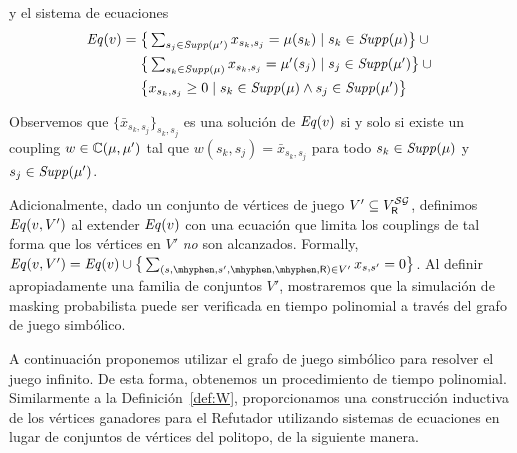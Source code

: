 \begin{definition}
  y el sistema de ecuaciones 
  {\footnotesize%
  \begin{align*}
    \mathit{Eq}(v) = {}
    & \textstyle
    \big\{ \sum_{s_j \in \mathit{Supp}(\mu')} x_{s_k,s_j}=\mu(s_k) \mid s_k \in \mathit{Supp}(\mu) \big\} \cup {} \\
    & \textstyle
    \big\{ \sum_{s_k \in \mathit{Supp}(\mu)} x_{s_k,s_j}=\mu'(s_j) \mid s_j \in \mathit{Supp}(\mu') \big\} \cup {} \\
    & \textstyle
    \big\{ x_{s_k,s_j} \geq 0 \mid s_k \in \mathit{Supp}(\mu) \wedge s_j \in \mathit{Supp}(\mu') \big\}
  \end{align*}
  }%
\end{definition} 


Observemos que $\{\bar{x}_{s_k,s_j}\}_{s_k,s_j}$ es una solución de 
$\mathit{Eq}(v)$ si y solo si existe un coupling
$w\in\mathbb{C}(\mu,\mu')$ tal que  $w(s_k,s_j)=\bar{x}_{s_k,s_j}$
para todo $s_k \in \mathit{Supp}(\mu)$ y $s_j \in \mathit{Supp}(\mu')$.

Adicionalmente, dado un conjunto de vértices de juego
$V' \subseteq V^{\mathcal{SG}}_{\mathsf{R}}$,
definimos $\mathit{Eq}(v, V')$ al extender $\mathit{Eq}(v)$ con una ecuación que limita los couplings de tal forma que los vértices en $V'$ \emph{no} son alcanzados.
Formally,
%
$\Eq(v, V') = \Eq(v) \cup \big\{\sum_{(s, \mhyphen, s', \mhyphen, \mhyphen, \Refuter) \in V'} x_{s,s'} = 0\big\}$.
%
Al definir apropiadamente una familia de conjuntos $V'$, mostraremos que la simulación de masking probabilista puede ser verificada en tiempo polinomial a través del grafo de juego simbólico.



A continuación proponemos utilizar el grafo de juego simbólico para resolver el juego infinito. De esta forma, obtenemos un procedimiento de tiempo polinomial.
Similarmente a la Definición~\ref{def:W}, proporcionamos una construcción inductiva de los vértices ganadores para el Refutador utilizando sistemas de ecuaciones en lugar de conjuntos de vértices del politopo, de la siguiente manera.

